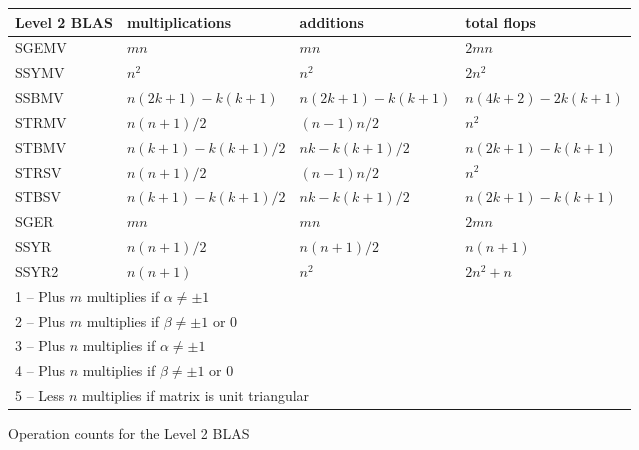 \TS
\begin{tabular}{| l | l | l | l |} \hline
Level 2 BLAS & multiplications      & additions      & total flops \\ \hline\hline
SGEMV \up{1,2}   & $ m n $    & $ m n $   & $ 2 m n $ \\
SSYMV \up{3,4}   & $ n^2 $    & $ n^2 $   & $ 2 n^2 $     \\
SSBMV \up{3,4}   & $ n (2k+1) - k (k+1) $ 
                 & $ n (2k+1) - k (k+1) $
                 & $ n(4k+2) - 2k(k+1) $ \\
STRMV \up{3,4,5} & $ n (n+1)/2 $ & $ (n-1) n / 2 $ & $ n^2 $ \\
STBMV \up{3,4,5} & $ n (k+1) - k(k+1)/2 $
                 & $ n k - k(k+1)/2 $
                 & $ n(2k+1) - k(k+1) $ \\
STRSV \up{5}     & $ n (n+1)/2 $ & $ (n-1) n / 2 $ & $ n^2 $ \\
STBSV \up{5}     & $ n (k+1) - k(k+1)/2 $
                 & $ n k - k(k+1)/2 $
                 & $ n (2k+1) - k(k+1) $ \\
SGER  \up{1}     & $ m n $    & $ m n  $  & $ 2 m n $ \\
SSYR  \up{3}     & $ n (n+1)/2 $ & $ n (n+1)/2 $ & $ n (n+1) $ \\
SSYR2 \up{3}     & $ n (n+1) $ & $ n^2 $  & $ 2 n^2 + n $  \\ \hline
\multicolumn{4}{l}{1 -- Plus $m$ multiplies if $\alpha \neq \pm 1 $ } \\
\multicolumn{4}{l}{2 -- Plus $m$ multiplies if $\beta \neq \pm 1$ or $0$ } \\
\multicolumn{4}{l}{3 -- Plus $n$ multiplies if $\alpha \neq \pm 1$ } \\
\multicolumn{4}{l}{4 -- Plus $n$ multiplies if $\beta \neq \pm 1$ or $0$ } \\
\multicolumn{4}{l}{5 -- Less $n$ multiplies if matrix is unit triangular } \\
\end{tabular}

\caption{Operation counts for the Level 2 BLAS}
\label{opcount-BLAS2}
\TE

